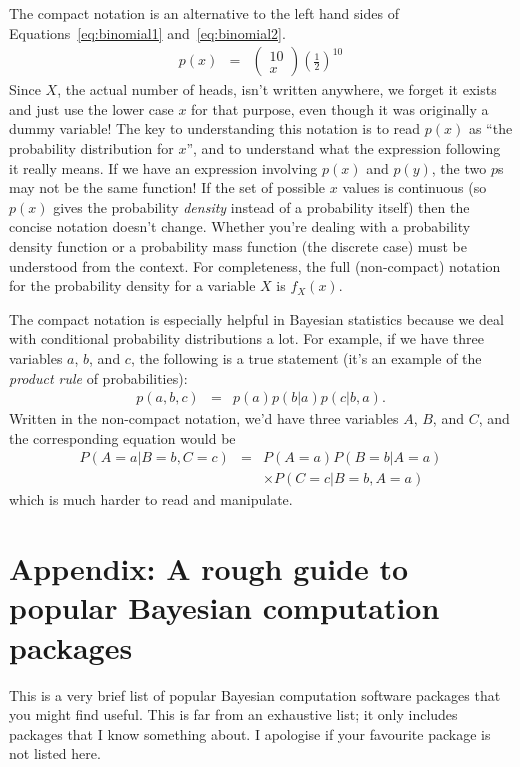 The compact notation is an alternative to the left hand sides of
Equations~\ref{eq:binomial1} and~\ref{eq:binomial2}.
\begin{eqnarray}
p(x) &=& \left(\begin{array}{cc}10\\ x\end{array}\right)
\left(\frac{1}{2}\right)^{10}
\end{eqnarray}
Since $X$, the actual number of heads, isn't written anywhere, we forget it
exists and just use the lower case $x$ for that purpose, even though it was
originally a dummy variable!
The key to understanding this notation is to read $p(x)$ as ``the probability
distribution for $x$'', and to understand what the expression following it
really means. If we have an expression involving $p(x)$ and $p(y)$, the two
$p$s may not be the same function!
If the set of possible $x$ values is continuous (so $p(x)$ gives
the probability {\it density} instead of a probability itself) then the
concise notation doesn't change. Whether you're dealing with a probability
density function or a probability mass function (the discrete case) must be
understood from the context. For completeness, the full
(non-compact) notation for the
probability density for a variable $X$ is $f_X(x)$.

The compact notation is especially helpful in Bayesian statistics because
we deal with conditional probability distributions a lot. For example, if we
have three variables $a$, $b$, and $c$, the following is a true statement
(it's an example of the {\it product rule} of probabilities):
\begin{eqnarray}
p(a, b, c) &=& p(a)p(b|a)p(c|b,a).
\end{eqnarray}
Written in the non-compact notation, we'd have three variables $A$, $B$, and
$C$, and the corresponding equation would be
\begin{eqnarray}
P(A=a | B=b, C=c) &=&
 P(A=a)P(B=b|A=a)\nonumber\\
& & \times P(C=c|B=b,A=a)
\end{eqnarray}
which is much harder to read and manipulate.



\section{Appendix: A rough guide to popular Bayesian computation packages}
This is a very brief list of popular Bayesian computation software packages
that you might find useful. This is far from an exhaustive list; it only
includes packages that I know something about. I apologise if your favourite
package is not listed here.\\

